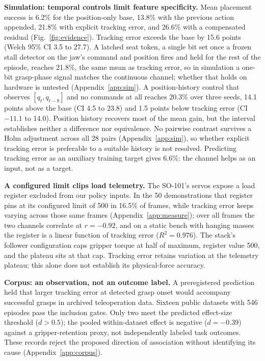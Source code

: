 \documentclass{article}
\begin{document}
\textbf{Simulation: temporal controls limit feature specificity.} Mean
placement success is 6.2\% for the position-only base, 13.8\% with the
previous action appended, 21.8\% with explicit tracking error, and 26.6\% with
a compensated residual (Fig.~\ref{fig:evidence}). Tracking error exceeds the
base by 15.6 points (Welch 95\% CI 3.5 to 27.7). A latched seat token, a
single bit set once a frozen stall detector on the jaw's command and position
fires and held for the rest of the episode, reaches 21.8\%, the same mean as
tracking error, so in simulation a one-bit grasp-phase signal matches the
continuous channel; whether that holds on hardware is untested
(Appendix~\ref{app:sim}). A position-history control
that observes $[q_t, q_{t-8}]$ and no
commands at all reaches 20.3\% over three seeds, 14.1 points above the base
(CI 4.5 to 23.8) and 1.5 points below tracking error (CI $-11.1$ to 14.0).
Position history recovers most of the mean gain, but the interval establishes
neither a difference nor equivalence. No pairwise contrast survives a Holm adjustment
across all 28 pairs (Appendix~\ref{app:sim}), so whether explicit tracking
error is preferable to a suitable history is not resolved. Predicting tracking error as an auxiliary training
target gives 6.6\%: the channel helps as an input, not as a target.

\textbf{A configured limit clips load telemetry.} The
SO-101's servos expose a load register excluded from our policy inputs. In the
50 demonstrations that register pins at its configured limit of 500 in
16.5\% of frames, while tracking error keeps varying across those same frames
(Appendix~\ref{app:measure}); over all frames the two channels correlate at
$r=-0.92$, and on a static bench with hanging masses the register is a linear
function of tracking error ($R^2=0.976$). The stack's follower configuration
caps gripper torque at half of maximum, register value 500, and the plateau
sits at that cap. Tracking error retains variation at the telemetry plateau;
this alone does not establish its physical-force accuracy.

\textbf{Corpus: an observation, not an outcome label.} A preregistered
prediction held that larger tracking error at detected grasp onset would
accompany successful grasps in archived teleoperation data. Sixteen public
datasets with 546 episodes pass the inclusion gates. Only two meet the
predicted effect-size threshold ($d>0.5$); the pooled within-dataset effect
is negative ($d=-0.39$) against a gripper-retention proxy, not independently
labeled task outcomes. These records reject the proposed direction of
association without identifying its cause (Appendix~\ref{app:corpus}).
\end{document}
